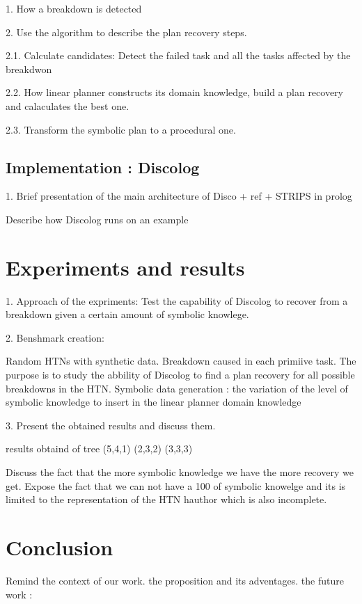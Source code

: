 \documentclass[conference]{IEEEtran}
\begin{document}
		
				1. How a breakdown is detected
				
				
				2. Use the algorithm to describe the plan recovery steps.
				
				
				2.1. Calculate candidates: Detect the failed task and all the tasks affected by the breakdwon
			
			
				2.2. How linear planner constructs its domain knowledge, build a plan recovery and calaculates the best one.
			
			
				2.3. Transform the symbolic plan to a procedural one.
		\subsection{Implementation : Discolog}
		1. Brief presentation of the main architecture of Disco + ref + STRIPS in prolog 
		
		Describe how Discolog runs on an example 
		
		
		\section{Experiments and results}
	
	
		1. Approach of the expriments: Test the capability of Discolog to recover from a breakdown given a certain amount of symbolic knowlege. 
	
	
		2. Benshmark creation:  
		
			Random HTNs with synthetic data. Breakdown caused in each primiive task. The purpose is to study the abbility of Discolog to find a plan recovery for all possible breakdowns in the HTN. 
			Symbolic data generation : the variation of the level of symbolic knowledge to insert in the linear planner domain knowledge
	
	
		3. Present the obtained results and discuss them. 
		
		results obtaind of tree (5,4,1) (2,3,2) (3,3,3) 
		
		
		Discuss the fact that the more symbolic knowledge we have the more recovery we get. 
		Expose the fact that we can not have a 100 of symbolic knowelge and its is limited to the representation of the HTN hauthor which is also incomplete.
		
	\section{Conclusion}
	Remind the context of our work. the proposition and its adventages. the future work : 
	
\end{document}
